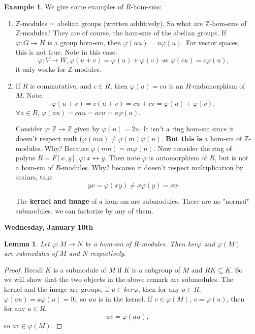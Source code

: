 \documentclass[12pt]{amsbook}
\theoremstyle{plain}
\numberwithin{section}{chapter}
\numberwithin{equation}{chapter}
\newtheorem{lem}[theorem]{Lemma}
\theoremstyle{definition}
\newtheorem{Ex}[theorem]{Example}
\theoremstyle{remark}
\newcommand{\sub}{\subseteq}
\renewcommand{\phi}{\varphi}
\begin{document}
\begin{Ex}
We give some examples of $R$-hom-sms:
\begin{enumerate}
\item $\mathbb{Z}$-modules = abelian groups (written additively). So what are $\mathbb{Z}$-hom-sms of $\mathbb{Z}$-modules? They are of course, the hom-sms of the abelian groups. If $\phi:G\to H$ is a group hom-sm, then $\phi(nu) = n\phi(u)$. For vector spaces, this is not true. Note in this case:
$$
\phi:V \to W, \phi(u + v) = \phi(u) + \phi(v) \nRightarrow \phi(cu) = c\phi(u),
$$
it only works for $\mathbb{Z}$-modules. 
\item If $R$ is commutative, and $c \in R$, then $\phi(u) = cu$ is an $R$-endomorphism of $M$. Note:
$$
\phi(u + v) = c(u + v)= cu+ cv = \phi(u) + \phi(v),
$$
$\forall a \in R$, $\phi(au) = cau = acu = a\phi(u)$. 
\vspace{3mm}

Consider $\phi:\mathbb{Z} \to \mathbb{Z}$ given by $\phi(n) = 2n$. It isn't a ring hom-sm since it doesn't respect mult ($\phi(mn) \neq \phi(m)\phi(n)$. \textbf{But this is} a hom-sm of $\mathbb{Z}$-modules. Why? Because $\phi(mn) = m\phi(n)$. Now consider the ring of polyns $R = F[x,y], \phi:x \leftrightarrow y$. Then note $\phi$ is automorphism of $R$, but is not a hom-sm of $R$-modules. Why? because it doesn't respect multiplication by scalars, take 
$$
yx = \phi(xy) \neq x\phi(y) = xx. 
$$

The \textbf{kernel and image} of a hom-sm are submodules. There are no "normal" submodules, we can factorize by any of them. 

\end{enumerate}
\end{Ex}

\textbf{Wednesday, January 10th}

\begin{lem}
Let $\phi:M \to N$ be a hom-sm of $R$-modules. Then ker$\phi$ and $\phi(M)$ are submodules of $M$ and $N$ respectively. 
\end{lem}

\begin{proof}
Recall $K$ is a submodule of $M$ if $K$ is a subgroup of $M$ and $RK \sub K$. So we will show that the two objects in the above remark are submodules. The kernel and the image are groups, if $u \in ker\phi$, then for any $a \in R$, $\phi(au) = a\phi(u) = 0$l, so $au$ is in the kernel. If $v \in \phi(M)$, $v = \phi(u)$, then for any $a \in R$,
$$
av = \phi(au),
$$
so $av \in \phi(M)$. 
\end{proof}
\end{document}
